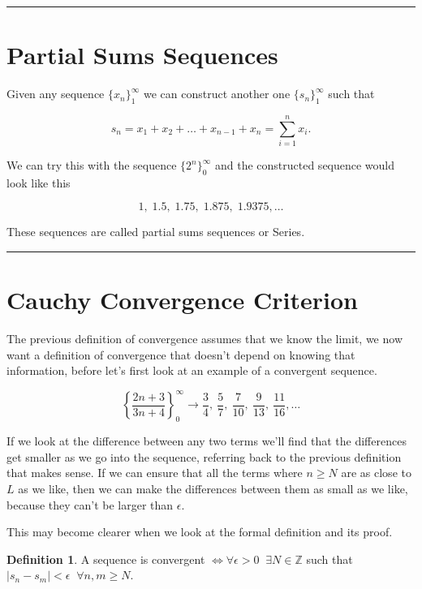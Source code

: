 \documentclass{article}
\theoremstyle{definition}
\newtheorem{definition}{Definition}
\begin{document}
\bigskip\hrule\bigskip

\section{Partial Sums Sequences}

Given any sequence $\{x_n\}^{\infty}_1$ we can construct another one $\{ s_n\}_1^\infty$ such that

\[
s_n = x_1 + x_2 +\dots+ x_{n-1} + x_n = \sum_{i=1}^n x_i.
\]

We can try this with the sequence $\{2^n\}_0^\infty$ and the constructed sequence would look like this

\[
1,\; 1.5,\; 1.75,\; 1.875,\; 1.9375,\dots
\]

These sequences are called partial sums sequences or Series.

\bigskip\hrule\bigskip

\section{Cauchy Convergence Criterion}

The previous definition of convergence assumes that we know the limit, we now want a definition of convergence that doesn't depend on knowing that information, before let's first look at an example of a convergent sequence.

\[
\left\{ \frac{2n + 3}{3n + 4} \right\}_0^\infty \rightarrow \frac{3}4,\ \frac{5}7,\ \frac{7}{10},\ \frac{9}{13},\ \frac{11}{16},\dots
\]

If we look at the difference between any two terms we'll find that the differences get smaller as we go into the sequence, referring back to the previous definition that makes sense. If we can ensure that all the terms where $n\geq N$ are as close to $L$ as we like, then we can make the differences between them as small as we like, because they can't be larger than $\epsilon$.

This may become clearer when we look at the formal definition and its proof.

\begin{definition}
A sequence is convergent $\iff \forall \epsilon > 0 \; \; \exists N \in \mathbb{Z}$ such that $|s_n - s_m| < \epsilon \; \; \forall n,m \geq N$.
\end{definition}
\end{document}
